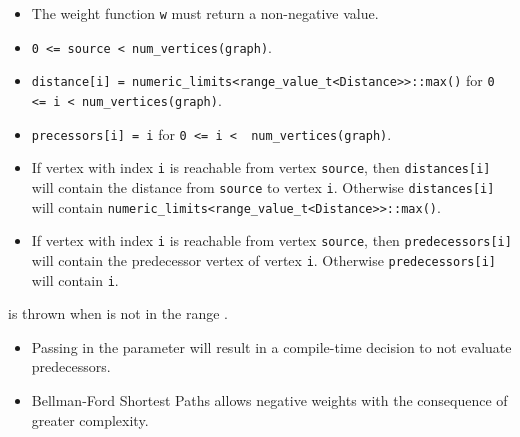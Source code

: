 {\small
      
}

\begin{itemdescr}
      \pnum\mandates
            \begin{itemize}
                  \item
                        The weight function \lstinline{w} must return a non-negative value.
            \end{itemize}
      \pnum\preconditions
            \begin{itemize}
                  \item
                        \lstinline{0 <= source < num_vertices(graph)}. 
                  \item
                        \lstinline{distance[i] = numeric_limits<range_value_t<Distance>>::max()}
                        for \lstinline{0 <= i < num_vertices(graph)}.  
                        \\ 
                  \item
                        \lstinline{precessors[i] = i} for \lstinline{0 <= i <  num_vertices(graph)}.
            \end{itemize}
      \pnum\effects
            \begin{itemize}
                  \item
                        If vertex with index \lstinline{i} is reachable from vertex \lstinline{source}, then
                        \lstinline{distances[i]} will contain the distance from \lstinline{source} to vertex
                        \lstinline{i}.  Otherwise \lstinline{distances[i]} will contain
                        \lstinline{numeric_limits<range_value_t<Distance>>::max()}.
                  \item
                        If vertex with index \lstinline{i} is reachable
                        from vertex \lstinline{source}, then \lstinline{predecessors[i]} will contain the
                        predecessor vertex of vertex \lstinline{i}. Otherwise \lstinline{predecessors[i]} will contain
                        \lstinline{i}.
            \end{itemize}
      \pnum\throws {} is thrown when  is not in the range .  \\
      \pnum\remarks 
            \begin{itemize}
                  \item 
                        Passing  in the  parameter will result in a compile-time decision
                        to not evaluate predecessors.
                  \item 
                        Bellman-Ford Shortest Paths allows negative weights with the consequence of greater complexity. \\
            \end{itemize}
\end{itemdescr}


